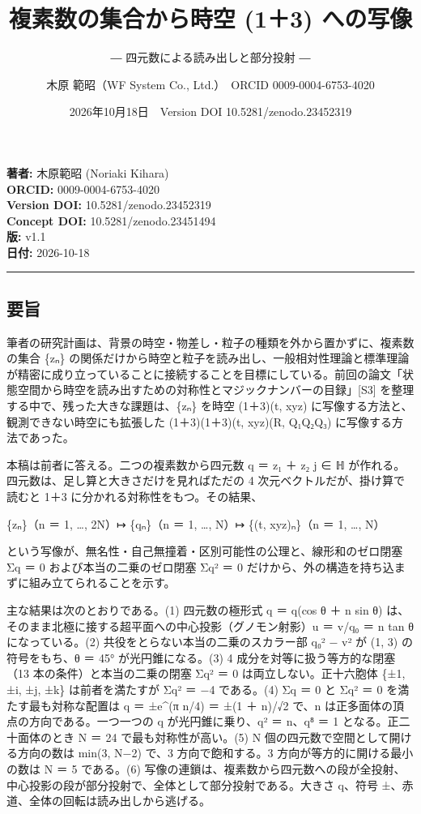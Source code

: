 \documentclass[
  a4paper,
]{ltjsarticle}
\title{複素数の集合から時空 (1＋3) への写像}
\subtitle{― 四元数による読み出しと部分投射 ―}
\author{木原 範昭（WF System Co., Ltd.）　ORCID 0009-0004-6753-4020}
\date{2026年10月18日　Version DOI 10.5281/zenodo.23452319}
\begin{document}
\maketitle

\textbf{著者:} 木原範昭 (Noriaki Kihara)\\
\textbf{ORCID:} 0009-0004-6753-4020\\
\textbf{Version DOI:} 10.5281/zenodo.23452319\\
\textbf{Concept DOI:} 10.5281/zenodo.23451494\\
\textbf{版:} v1.1\\
\textbf{日付:} 2026-10-18

\begin{center}\rule{0.5\linewidth}{0.5pt}\end{center}

\subsection{要旨}\label{ux8981ux65e8}

筆者の研究計画は、背景の時空・物差し・粒子の種類を外から置かずに、複素数の集合
\{zₙ\}
の関係だけから時空と粒子を読み出し、一般相対性理論と標準理論が精密に成り立っていることに接続することを目標にしている。前回の論文「状態空間から時空を読み出すための対称性とマジックナンバーの目録」{[}S3{]}
を整理する中で、残った大きな課題は、\{zₙ\} を時空 (1＋3)(t, xyz)
に写像する方法と、観測できない時空にも拡張した (1＋3)(1＋3)(t, xyz)(R,
Q₁Q₂Q₃) に写像する方法であった。

本稿は前者に答える。二つの複素数から四元数 q ＝ z₁ ＋ z₂ j ∈ ℍ
が作れる。四元数は、足し算と大きさだけを見ればただの 4
次元ベクトルだが、掛け算で読むと 1＋3 に分かれる対称性をもつ。その結果、

\{zₙ\}（n ＝ 1, \ldots, 2N）↦ \{qₙ\}（n ＝ 1, \ldots, N）↦ \{(t,
xyz)ₙ\}（n ＝ 1, \ldots, N）

という写像が、無名性・自己無撞着・区別可能性の公理と、線形和のゼロ閉塞
Σq ＝ 0 および本当の二乗のゼロ閉塞 Σq² ＝ 0
だけから、外の構造を持ち込まずに組み立てられることを示す。

主な結果は次のとおりである。(1) 四元数の極形式 q ＝
\textbar q\textbar(cos θ ＋ n sin θ)
は、そのまま北極に接する超平面への中心投影（グノモン射影）u ＝ v/q₀ ＝ n
tan θ になっている。(2) 共役をとらない本当の二乗のスカラー部 q₀² −
\textbar v\textbar² が (1, 3) の符号をもち、θ ＝ 45° が光円錐になる。(3)
4 成分を対等に扱う等方的な閉塞（13 本の条件）と本当の二乗の閉塞 Σq² ＝ 0
は両立しない。正十六胞体 \{±1, ±i, ±j, ±k\} は前者を満たすが Σq² ＝ −4
である。(4) Σq ＝ 0 と Σq² ＝ 0 を満たす最も対称な配置は q ＝ ±e\^{}(π
n/4) ＝ ±(1 ＋ n)/√2 で、n は正多面体の頂点の方向である。一つ一つの q
が光円錐に乗り、q² ＝ n、q⁸ ＝ 1 となる。正二十面体のとき N ＝ 24
で最も対称性が高い。(5) N 個の四元数で空間として開ける方向の数は min(3,
N−2) で、3 方向で飽和する。3 方向が等方的に開ける最小の数は N ＝ 5
である。(6)
写像の連鎖は、複素数から四元数への段が全投射、中心投影の段が部分投射で、全体として部分投射である。大きさ
\textbar q\textbar、符号 ±、赤道、全体の回転は読み出しから逃げる。
\end{document}
